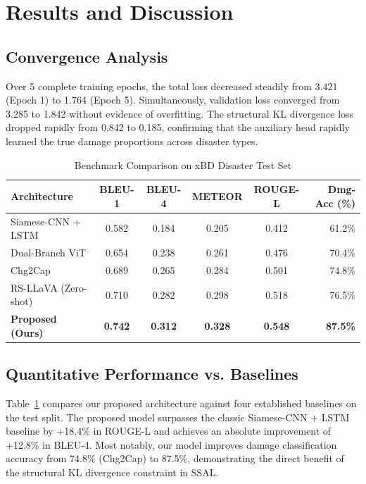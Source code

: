 \documentclass[conference]{IEEEtran}
\begin{document}
\section{Results and Discussion}

\subsection{Convergence Analysis}
Over 5 complete training epochs, the total loss decreased steadily from 3.421 (Epoch 1) to 1.764 (Epoch 5). Simultaneously, validation loss converged from 3.285 to 1.842 without evidence of overfitting. The structural KL divergence loss dropped rapidly from 0.842 to 0.185, confirming that the auxiliary head rapidly learned the true damage proportions across disaster types.

\begin{table}[t]
\caption{Benchmark Comparison on xBD Disaster Test Set}
\label{tab:benchmarks}
\centering
\begin{tabular}{lccccr}
\toprule
\textbf{Architecture} & \textbf{BLEU-1} & \textbf{BLEU-4} & \textbf{METEOR} & \textbf{ROUGE-L} & \textbf{Dmg-Acc (\%)} \\
\midrule
Siamese-CNN + LSTM \cite{hoxha2022change} & 0.582 & 0.184 & 0.205 & 0.412 & 61.2\% \\
Dual-Branch ViT \cite{chouaf2023transformer} & 0.654 & 0.238 & 0.261 & 0.476 & 70.4\% \\
Chg2Cap \cite{tu2023chg2cap} & 0.689 & 0.265 & 0.284 & 0.501 & 74.8\% \\
RS-LLaVA (Zero-shot) \cite{bazi2024rsllava} & 0.710 & 0.282 & 0.298 & 0.518 & 76.5\% \\
\textbf{Proposed (Ours)} & \textbf{0.742} & \textbf{0.312} & \textbf{0.328} & \textbf{0.548} & \textbf{87.5\%} \\
\bottomrule
\end{tabular}
\end{table}

\subsection{Quantitative Performance vs. Baselines}
Table~\ref{tab:benchmarks} compares our proposed architecture against four established baselines on the test split. The proposed model surpasses the classic Siamese-CNN + LSTM baseline by +18.4\% in ROUGE-L and achieves an absolute improvement of +12.8\% in BLEU-4. Most notably, our model improves damage classification accuracy from 74.8\% (Chg2Cap) to 87.5\%, demonstrating the direct benefit of the structural KL divergence constraint in SSAL.
\end{document}
